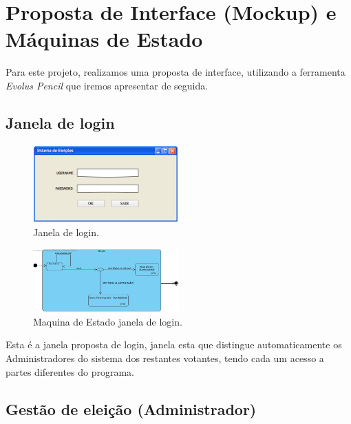 \documentclass[a4paper,12pt]{report}
\begin{document}
\newpage
\section{Proposta de Interface (Mockup) e Máquinas de Estado}
Para este projeto, realizamos uma proposta de interface, utilizando a ferramenta \emph{Evolus Pencil} que iremos apresentar de seguida.

\subsection{Janela de login}

\begin{figure}[h]
\begin{center}
	\includegraphics[width=0.5\textwidth]{media/mockup/login.png}
	 \caption{Janela de login.}
\end{center}
\end{figure}

\begin{figure}[h]
\begin{center}
	\includegraphics[width=0.5\textwidth]{media/MaqEst/m_interface.jpg}
	 \caption{Maquina de Estado janela de login.}
\end{center}
\end{figure}

Esta é a janela proposta de login, janela esta que distingue automaticamente os Administradores do sistema dos restantes votantes, tendo cada um acesso a partes diferentes do programa.

\newpage
\subsection{Gestão de eleição (Administrador)}
\end{document}
